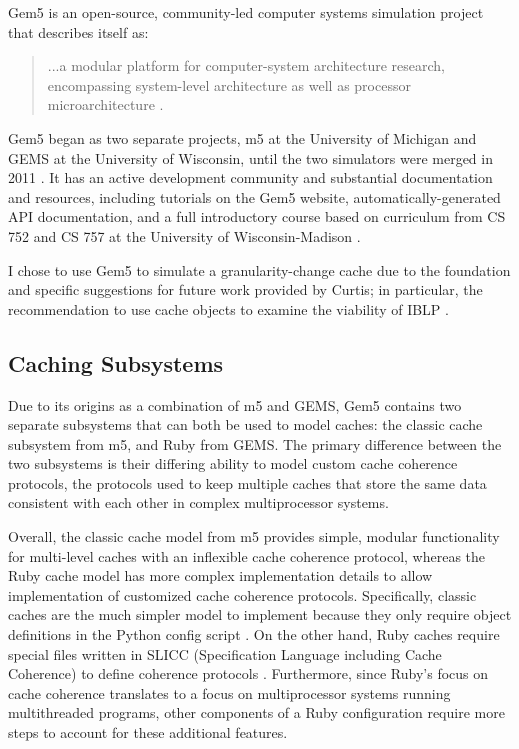 \documentclass[12pt,twoside]{reedthesis}
\begin{document}
Gem5 is an open-source, community-led computer systems simulation project that describes itself as: \begin{quote}
	...a modular platform for computer-system architecture research, encompassing system-level architecture as well as processor microarchitecture \cite{gem5-about}.
\end{quote}

Gem5 began as two separate projects, m5 at the University of Michigan and GEMS at the University of Wisconsin, until the two simulators were merged in 2011 \cite{gem5-about}. It has an active development community and substantial documentation and resources, including tutorials on the Gem5 website, automatically-generated API documentation, and a full introductory course based on curriculum from CS 752 and CS 757 at the University of Wisconsin-Madison \cite{gem5-docs}.

I chose to use Gem5 to simulate a granularity-change cache due to the foundation and specific suggestions for future work provided by Curtis; in particular, the recommendation to use cache objects to examine the viability of IBLP \cite{curtis}.

	\subsection*{Caching Subsystems}

	Due to its origins as a combination of m5 and GEMS, Gem5 contains two separate subsystems that can both be used to model caches: the classic cache subsystem from m5, and Ruby from GEMS. The primary difference between the two subsystems is their differing ability to model custom cache coherence protocols, the protocols used to keep multiple caches that store the same data consistent with each other in complex multiprocessor systems.

	Overall, the classic cache model from m5 provides simple, modular functionality for multi-level caches with an inflexible cache coherence protocol, whereas the Ruby cache model has more complex implementation details to allow implementation of customized cache coherence protocols. Specifically, classic caches are the much simpler model to implement because they only require object definitions in the Python config script \cite{gem5-tutorial}. On the other hand, Ruby caches require special files written in SLICC (Specification Language including Cache Coherence) to define coherence protocols \cite{gem5-ruby}. Furthermore, since Ruby's focus on cache coherence translates to a focus on multiprocessor systems running multithreaded programs, other components of a Ruby configuration require more steps to account for these additional features.
\end{document}

